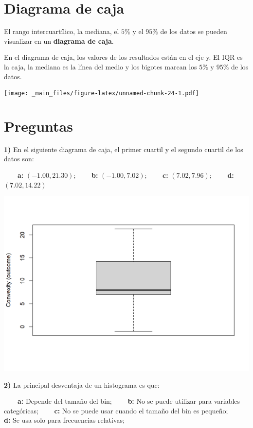 \documentclass[
]{book}
\begin{document}
\hypertarget{diagrama-de-caja}{%
\section{Diagrama de caja}\label{diagrama-de-caja}}

El rango intercuartílico, la mediana, el \(5\%\) y el \(95\%\) de los datos se pueden visualizar en un \textbf{diagrama de caja}.

En el diagrama de caja, los valores de los resultados están en el eje y. El IQR es la caja, la mediana es la línea del medio y los bigotes marcan los \(5\%\) y \(95\%\) de los datos.

\texttt{[image: \_main\_files/figure-latex/unnamed-chunk-24-1.pdf]}

\hypertarget{preguntas}{%
\section{Preguntas}\label{preguntas}}

\textbf{1)} En el siguiente diagrama de caja, el primer cuartil y el segundo cuartil de los datos son:

\textbf{\(\qquad\)a:} \((-1.00, 21.30)\); \textbf{\(\qquad\)b:} \((-1.00, 7.02)\); \textbf{\(\qquad\)c:} \((7.02, 7.96)\); \textbf{\(\qquad\)d:} \((7.02, 14.22)\)

\includegraphics{./figures/box.png}

\textbf{2)} La principal desventaja de un histograma es que:

\textbf{\(\qquad\)a:} Depende del tamaño del bin; \textbf{\(\qquad\)b:} No se puede utilizar para variables categóricas;
\textbf{\(\qquad\)c:} No se puede usar cuando el tamaño del bin es pequeño;
\textbf{\(\qquad\)d:} Se usa solo para frecuencias relativas;
\end{document}
